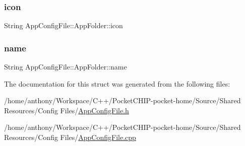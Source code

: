 \mbox{\label{structAppConfigFile_1_1AppFolder_a1eb7b7f0c9b50d4769fb8bc8a8d27a73}} 
\subsubsection{\texorpdfstring{icon}{icon}}
{\footnotesize\ttfamily String App\+Config\+File\+::\+App\+Folder\+::icon}

\mbox{\label{structAppConfigFile_1_1AppFolder_ac4a3f42ba47f0f55b09c0c7cf30f9614}} 
\subsubsection{\texorpdfstring{name}{name}}
{\footnotesize\ttfamily String App\+Config\+File\+::\+App\+Folder\+::name}



The documentation for this struct was generated from the following files\+:\begin{DoxyCompactItemize}
\item 
/home/anthony/\+Workspace/\+C++/\+Pocket\+C\+H\+I\+P-\/pocket-\/home/\+Source/\+Shared Resources/\+Config Files/\mbox{\hyperlink{AppConfigFile_8h}{App\+Config\+File.\+h}}\item 
/home/anthony/\+Workspace/\+C++/\+Pocket\+C\+H\+I\+P-\/pocket-\/home/\+Source/\+Shared Resources/\+Config Files/\mbox{\hyperlink{AppConfigFile_8cpp}{App\+Config\+File.\+cpp}}\end{DoxyCompactItemize}

